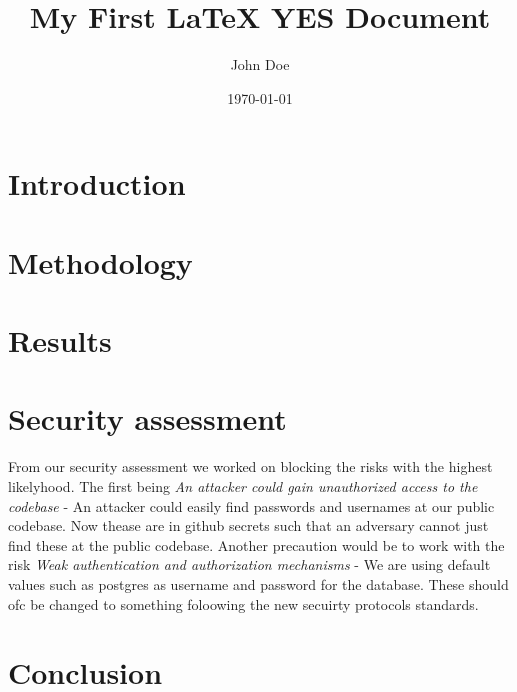 \documentclass{article}
\title{My First LaTeX YES Document}
\author{John Doe}
\date{\today}
\begin{document}
\maketitle

\section{Introduction}

\lipsum[1]

\section{Methodology}

\lipsum[2]

\section{Results}

\lipsum[3]
\section{Security assessment}
From our security assessment we worked on blocking the risks with the highest likelyhood. The first being \textit{An attacker could gain unauthorized access to the codebase}
- An attacker could easily find passwords and usernames at our public codebase. Now thease are in github secrets such that an adversary cannot just 
find these at the public codebase. Another precaution would be to work with the risk \textit{Weak authentication and authorization mechanisms}
 - We are using default values such as postgres as username and password for the database. These should ofc be changed to something foloowing the
 new secuirty protocols standards. 


\section{Conclusion}

\lipsum[4]
\end{document}
